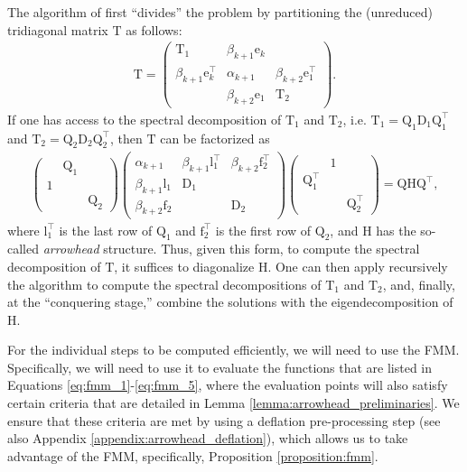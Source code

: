 \documentclass{article}
\newcommand\vece{\boldsymbol{\mathrm{e}}}
\newcommand\vecf{\boldsymbol{\mathrm{f}}}
\newcommand\vecl{\boldsymbol{\mathrm{l}}}
\newcommand\matD{\boldsymbol{\mathrm{D}}}
\newcommand\matH{\boldsymbol{\mathrm{H}}}
\newcommand\matQ{\boldsymbol{\mathrm{Q}}}
\newcommand\matT{\boldsymbol{\mathrm{T}}}
\begin{document}
The algorithm of \cite{gu1995divide} first ``divides'' the problem by partitioning the (unreduced) tridiagonal matrix $\matT$ as follows:
\begin{align*}
    \matT = \begin{pmatrix}
        \matT_1 & \beta_{k+1}\vece_k & \\
        \beta_{k+1}\vece_k^\top & \alpha_{k+1} & \beta_{k+2}\vece_1^\top \\
         & \beta_{k+2}\vece_1 & \matT_2
    \end{pmatrix}.
\end{align*}
If one has access to the spectral decomposition of $\matT_1$ and $\matT_2$, i.e. $\matT_1=\matQ_1\matD_1\matQ_1^\top$ and $\matT_2=\matQ_2\matD_2\matQ_2^\top$, then $\matT$ can be factorized as
\begin{align}
    \label{eq:tridiagonal_to_arrowhead}
    \begin{pmatrix}
        & \matQ_1 & \\
        1 & & \\
        & & \matQ_2
    \end{pmatrix}    
    \begin{pmatrix}
        \alpha_{k+1}& \beta_{k+1}\vecl_1^\top   & \beta_{k+2}\vecf_2^\top\\
        \beta_{k+1}\vecl_1 & \matD_1 & \\
         \beta_{k+2}\vecf_2& & \matD_2
    \end{pmatrix}
    \begin{pmatrix}
        & 1 & \\
        \matQ_1^\top & & \\
        & & \matQ_2^\top
    \end{pmatrix}
    =
    \matQ\matH\matQ^\top,
\end{align}
where $\vecl_1^\top$ is the last row of $\matQ_1$ and $\vecf_2^\top$ is the first row of $\matQ_2$, and $\matH$ has the so-called \textit{arrowhead} structure. Thus, given this form, to compute the spectral decomposition of $\matT$, it suffices to diagonalize $\matH$. One can then apply recursively the algorithm to compute the spectral decompositions of $\matT_1$ and $\matT_2$, and, finally, at the ``conquering stage,'' combine the solutions with the eigendecomposition of $\matH$.

For the individual steps to be computed efficiently, we will need to use the FMM. Specifically, we will need to use it to evaluate the functions that are listed in Equations \eqref{eq:fmm_1}-\eqref{eq:fmm_5}, where the evaluation points will also satisfy certain criteria that are detailed in Lemma \ref{lemma:arrowhead_preliminaries}. 
We ensure that these criteria are met by using a deflation pre-processing step (see also Appendix \ref{appendix:arrowhead_deflation}), which allows us to take advantage of the FMM, specifically, Proposition \ref{proposition:fmm}. 
\end{document}
